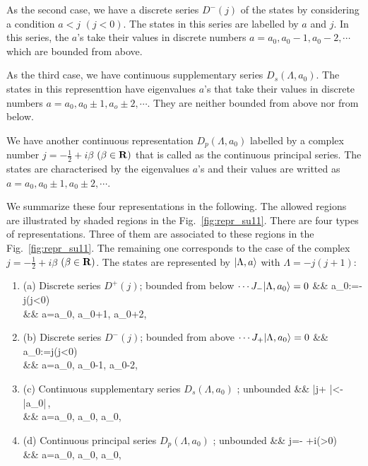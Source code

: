 \documentclass[a4paper,11pt]{article}
\begin{document}
As the second case, we have a discrete series $D^{-}(j)$ of the states 
by considering a condition $a<j$ $(j<0)$. 
The states in this series are labelled by 
$a$ and $j$. 
In this series, the $a$'s take their values in discrete numbers $a=a_0,a_0-1, a_0-2,\cdots$ 
which are bounded from above. 

As the third case, we have continuous supplementary series $D_s(\Lambda ,a_0)$. 
The states in this representtion have eigenvalues $a$'s 
that take their values in discrete numbers 
$a=a_0, a_0\pm 1,a_o\pm 2,\cdots$. They are neither bounded from above nor 
from below.

We have another continuous representation 
$D_p(\Lambda ,a_0)$ labelled by 
a complex number 
$j=-\frac{1}{2}+i\beta$ $(\beta \in {\bf R})$ 
that is called as the continuous principal series. 
The states are characterised by the eigenvalues 
$a$'s and their values are writted as 
$a=a_0, a_0\pm 1, a_0\pm 2,\cdots$. 

We summarize these four representations in the following.
The allowed regions are illustrated by shaded regions in the Fig.~\ref{fig:repr_su11}.
There are four types of representations. Three of them are associated to 
these regions in the Fig.~\ref{fig:repr_su11}. 
The remaining one corresponds to the case of the complex 
$j=-\frac{1}{2}+i\beta $ $(\beta\in {\bf R})$. 
The states are represented by $| {\Lambda,a} \rangle$ with 
$\Lambda  =-j(j+1)$:
\begin{enumerate}
\item[] (a) Discrete series $D^+(j)$; bounded from below
$\cdots J_- | {\Lambda ,a_0} \rangle=0$
\beq
&& a_0:=-j\quad (j<0)\\
&& a=a_0, a_0+1, a_0+2,\cdots 
\eeq

\item[] (b) Discrete series $D^-(j)$; bounded from above 
$\cdots J_+ | {\Lambda ,a_0} \rangle=0$
\beq
&& a_0:=j\quad (j<0)\\
&& a=a_0, a_0-1, a_0-2,\cdots 
\eeq

\item[] (c) Continuous supplementary series $D_s(\Lambda ,a_0)$ 
; unbounded
\beq
&& \left|j+ \right|<-|a_0|\,,\\
&&  a=a_0, a_0, a_0,\cdots 
\eeq

\item[] (d) Continuous principal series $D_p(\Lambda ,a_0)$
; unbounded
\beq
&& j=- +i\beta \quad (\beta >0)\\
&&  a=a_0, a_0, a_0,\cdots 
\eeq

\end{enumerate}
\end{document}
